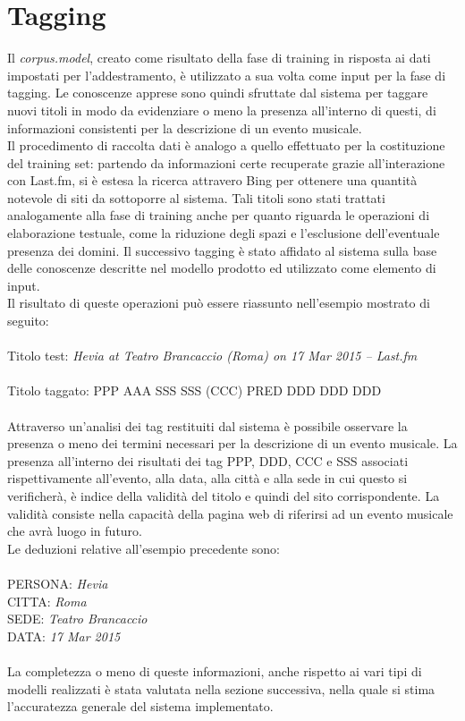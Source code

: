 \documentclass[a4paper]{report}
\begin{document}
\section{Tagging}
Il \textit{corpus.model}, creato come risultato della fase di training in risposta ai dati impostati per l'addestramento, è utilizzato a sua volta come input per la fase di tagging. Le conoscenze apprese sono quindi sfruttate dal sistema per taggare nuovi titoli in modo da evidenziare o meno la presenza all'interno di questi, di informazioni consistenti per la descrizione di un evento musicale. \\
Il procedimento di raccolta dati è analogo a quello effettuato per la costituzione del training set: partendo da informazioni certe recuperate grazie all'interazione con Last.fm, si è estesa la ricerca attravero Bing per ottenere una quantità notevole di siti da sottoporre al sistema. Tali titoli sono stati trattati analogamente alla fase di training anche per quanto riguarda le operazioni di elaborazione testuale, come la riduzione degli spazi e l'esclusione dell'eventuale presenza dei domini. Il successivo tagging è stato affidato al sistema sulla base delle conoscenze descritte nel modello prodotto ed utilizzato come elemento di input. \\
Il risultato di queste operazioni può essere riassunto nell'esempio mostrato di seguito: \\ \\
Titolo test: \textit{Hevia at Teatro Brancaccio  (Roma) on 17 Mar 2015 – Last.fm} \\ \\
Titolo taggato: PPP AAA SSS SSS (CCC) PRED DDD DDD DDD \\ \\
Attraverso un'analisi dei tag restituiti dal sistema è possibile osservare la presenza o meno dei termini necessari per la descrizione di un evento musicale. La presenza all'interno dei risultati dei tag PPP, DDD, CCC e SSS associati rispettivamente all'evento, alla data, alla città e alla sede in cui questo si verificherà, è indice della validità del titolo e quindi del sito corrispondente. La validità consiste nella capacità della pagina web di riferirsi ad un evento musicale che avrà luogo in futuro.\\ Le deduzioni relative all'esempio precedente sono: \\ \\
PERSONA: \textit{Hevia}\\
CITTA: \textit{Roma}\\
SEDE: \textit{Teatro Brancaccio}\\
DATA: \textit{17 Mar 2015} \\ \\
La completezza o meno di queste informazioni, anche rispetto ai vari tipi di modelli realizzati è stata valutata nella sezione successiva, nella quale si stima l'accuratezza generale del sistema implementato.
\end{document}
